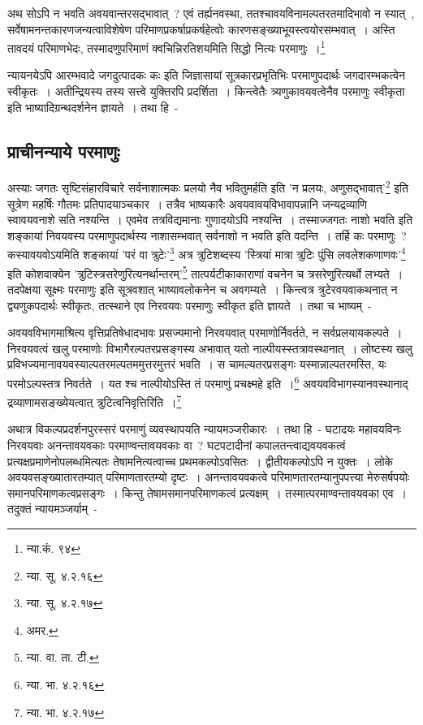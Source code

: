 		{\fontsize{11.7}{0}\selectfont\s अथ सोऽपि न भवति अवयवान्तरसद्भावात्~? एवं तर्ह्यनवस्था, ततश्चावयविनामल्पतरतमादिभावो न स्यात्~, सर्वेषामनन्तकारणजन्यत्वाविशेषेण परिमाणप्रकर्षाप्रकर्षहेत्वोः कारणसङ्ख्याभूयस्त्वयोरसम्भवात्~। अस्ति तावदयं परिमाणभेदः, तस्मादणुपरिमाणं क्वचिन्निरतिशयमिति सिद्धो नित्यः परमाणुः~।\footnote{न्या.कं. ९४}}

	न्यायनयेऽपि आरम्भवादे जगदुत्पादकः कः इति जिज्ञासायां सूत्रकारप्रभृतिभिः परमाणुपदार्थः जगदारम्भकत्वेन स्वीकृतः~। अतीन्द्रियस्य तस्य सत्त्वे युक्तिरपि प्रदर्शिता~। किन्त्वेतैः त्र्यणुकावयवत्वेनैव परमाणुः स्वीकृता इति भाष्यादिग्रन्थदर्शनेन ज्ञायते~। तथा हि~-

		\subsection{प्राचीनन्याये परमाणुः}

		अस्याः जगतः सृष्टिसंहारविचारे सर्वनाशात्मकः प्रलयो नैव भवितुमर्हति इति 'न प्रलयः, अणुसद्भावात्'\footnote{न्या. सू. ४.२.१६} इति सूत्रेण महर्षिः गौतमः प्रतिपादयाञ्चकार~। तत्रैव भाष्यकारैः अवयवावयविभावापन्नानि जन्यद्रव्याणि स्वावयवनाशे सति नश्यन्ति~। एवमेव तत्रविद्यमानाः गुणादयोऽपि नश्यन्ति~। तस्माज्जगतः नाशो भवति इति शङ्कायां निवयवस्य परमाणुपदार्थस्य नाशासम्भवात् सर्वनाशो न भवति इति वदन्ति~। तर्हि कः परमाणुः~? कस्यावयवोऽयमिति शङ्कायां 'परं वा त्रुटेः'\footnote{न्या. सू. ४.२.१७} अत्र त्रुटिशब्दस्य 'स्त्रियां मात्रा त्रुटिः पुंसि लवलेशकणाणवः'\footnote{अमर. } इति कोशवाक्येन 'त्रुटिस्त्रसरेणुरित्यनर्थान्तरम्'\footnote{न्या. वा. ता. टी.} तात्पर्यटीकाकाराणां वचनेन च त्रसरेणुरित्यर्थो लभ्यते~। तदपेक्षया सूक्ष्मः परमाणुः इति सूत्रवशात् भाष्यावलोकनेन च अवगम्यते~। किन्त्वत्र त्रुटेरवयवाकथनात् न द्व्यणुकपदार्थः स्वीकृतः, तत्स्थाने एव निरवयवः परमाणुः स्वीकृत इति ज्ञायते~। तथा च भाष्यम्~-

		{\fontsize{11.7}{0}\selectfont\s अवयवविभागमाश्रित्य वृत्तिप्रतिषेधादभावः प्रसज्यमानो निरवयवात् परमाणोर्निवर्तते, न सर्वप्रलयायकल्पते~। निरवयवत्वं खलु परमाणोः विभागैरल्पतरप्रसङ्गस्य अभावात् यतो नाल्पीयस्स्तत्रावस्थानात्~। लोष्टस्य खलु प्रविभज्यमानावयवस्याल्पतरमल्पतममुत्तरमुत्तरं भवति~। स चामल्यतरप्रसङ्गः यस्मान्नाल्पतरमस्ति, यः परमोऽल्पस्तत्र निवर्तते~। यत श्च नाल्पीयोऽस्ति तं परमाणुं प्रचक्ष्महे इति~।\footnote{न्या. भा. ४.२.१६} अवयवविभागस्यानवस्थानाद् द्रव्याणामसङ्ख्येयत्वात् त्रुटित्वनिवृत्तिरिति~।\footnote{न्या. भा. ४.२.१७}}

		अथात्र विकल्पप्रदर्शनपुरस्सरं परमाणुं व्यवस्थापयति न्यायमञ्जरीकारः~। तथा हि~- घटादयः महावयविनः निरवयवाः अनन्तावयवकाः परमाण्वन्तावयवकाः वा~? घटपटादीनां कपालतन्त्वाद्यवयवकत्वं प्रत्यक्षप्रमाणेनोपलब्धमित्यतः तेषामनित्यत्वाच्च प्रथमकल्पोऽवसितः~। द्वीतीयकल्पोऽपि न युक्तः~। लोके अवयवसङ्ख्यातारतम्यात् परिमाणतारतम्यो दृष्टः~। अनन्तावयवकत्वे परिमाणतारतम्यानुपपत्त्या मेरुसर्षपयोः समानपरिमाणकत्वप्रसङ्गः~। किन्तु तेषामसमानपरिमाणकत्वं प्रत्यक्षम्~। तस्मात्परमाण्वन्तावयवका एव~। तदुक्तं न्यायमञ्जर्याम्~- 

